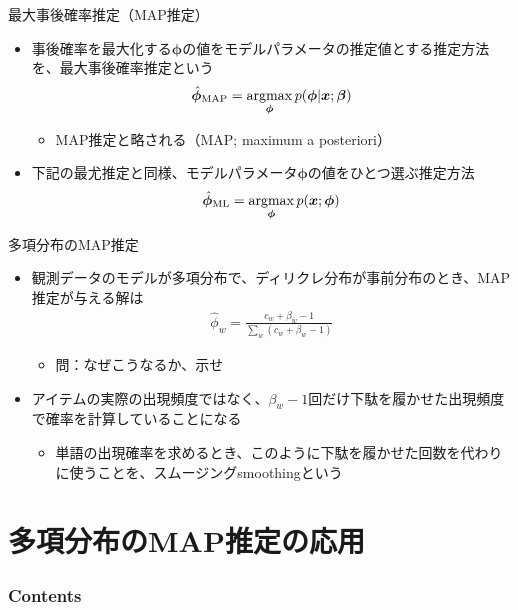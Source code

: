 \documentclass[aspectratio=169,unicode,dvipdfmx,14pt]{beamer}
\begin{document}
\begin{frame}{最大事後確率推定（MAP推定）}
\begin{itemize}
\item 事後確率を最大化する$\bm{\phi}$の値をモデルパラメータの推定値とする推定方法を、最大事後確率推定という
\begin{align}
\hat{\bm{\phi}}_{\mbox{\scriptsize MAP}} = \operatorname*{argmax}_{\bm{\phi}} p(\bm{\phi}|\bm{x};\bm{\beta})
\end{align}
\begin{itemize}
\item MAP推定と略される（MAP; maximum a posteriori）
\end{itemize}
\item 下記の最尤推定と同様、モデルパラメータ$\bm{\phi}$の値をひとつ選ぶ推定方法
\begin{align}
\hat{\bm{\phi}}_{\mbox{\scriptsize ML}} = \operatorname*{argmax}_{\bm{\phi}} p(\bm{x};\bm{\phi})
\end{align}
\end{itemize}
\end{frame}

\begin{frame}{多項分布のMAP推定}
\begin{itemize}
\item 観測データのモデルが多項分布で、ディリクレ分布が事前分布のとき、MAP推定が与える解は
\begin{align}
\hat{\phi}_w = \frac{c_w + \beta_w - 1}{\sum_w (c_w + \beta_w - 1)} 
\end{align}
\begin{itemize}
\item 問：なぜこうなるか、示せ
\end{itemize}
\item アイテムの実際の出現頻度ではなく、$\beta_w - 1$回だけ下駄を履かせた出現頻度で確率を計算していることになる
\begin{itemize}
\item 単語の出現確率を求めるとき、このように下駄を履かせた回数を代わりに使うことを、スムージングsmoothingという
\end{itemize}
\end{itemize}
\end{frame}


\section{多項分布のMAP推定の応用}

\begin{frame}\frametitle{Contents}
\Large \tableofcontents[currentsection]
\end{frame}
\end{document}
